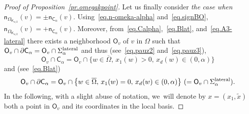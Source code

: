 \documentclass[JEP,XML,SOM,Unicode,NoEqCountersInSection,NoFloatCountersInSection,published]{cedram}
\let\pa\partial
\theoremstyle{plain}
\theoremstyle{definition}
\begin{document}
\begin{proof}[Proof of Proposition~\ref{pr.omegakpoint}]
Let us finally consider \emph{the case when $\mathsf n_{\Omega_{\mathsf K_{\alpha/2}}}(v)=\pm \mathsf n_{\mathsf C_\alpha}(v)$}. Using~\eqref{eq.n-omeka-alpha} and~\eqref{eq.signBO},
$\mathsf n_{\Omega_{\mathsf K_{\alpha/2}}}(v)= +\mathsf n_{\mathsf C_\alpha}(v)$. Moreover, from~\eqref{eq.Calpha},~\eqref{eq.Blat}, and~\eqref{eq.A3-lateral} there exists a neighborhood $\mathsf O_v$ of $v$ in $\Omega$ such that $ \mathsf O_v\cap \pa \mathsf C_\alpha= \mathsf O_v\cap \Sigma_\alpha^{\textup{lateral}}$ and thus (see~\eqref{eq.pauz2} and~\eqref{eq.pauz3}),
\[
\mathsf O_v\cap \mathsf C_\alpha=\mathsf O_v\cap\big \{w\in \overline \Omega, \, x_1(w)>0, \, x_d(w)\in (0,\alpha)\big \}
\]
and (see~\eqref{eq.Blat})
\begin{equation}\label{eq.normalCalpha}
\mathsf O_v\cap \pa \mathsf C_\alpha=\mathsf O_v\cap\big \{w\in \overline \Omega, \, x_1(w)=0, \, x_d(w)\in (0,\alpha)\big \}\ (=\mathsf O_v\cap \Sigma_\alpha^{\textup{lateral}}).
\end{equation}
In the following, with a slight abuse of notation, we~will denote by $x=(x_1,\tilde x)$ both a point in $\mathsf O_v$ and its coordinates in the local basis.


\end{proof}
\end{document}
